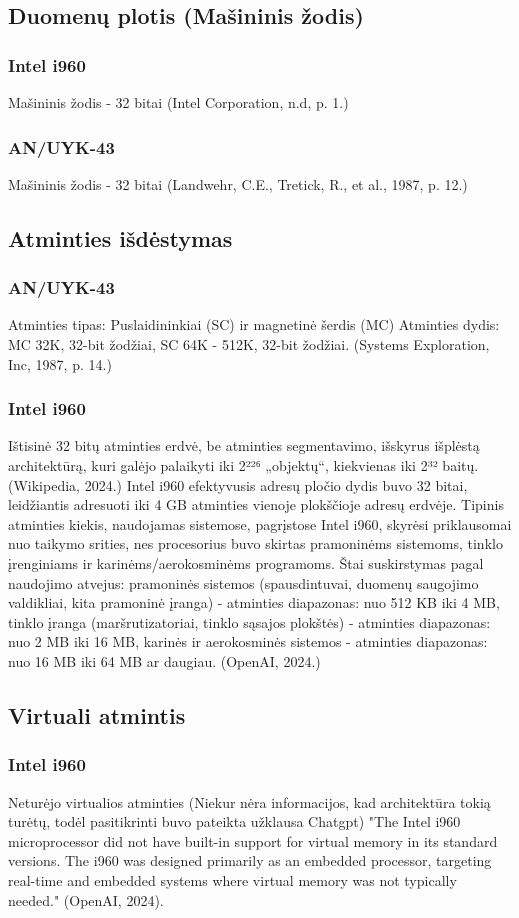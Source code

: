 \documentclass{article}
\begin{document}
\subsection{Duomenų plotis (Mašininis žodis)}
\subsubsection{Intel i960}
Mašininis žodis - 32 bitai (Intel Corporation, n.d, p. 1.)
\subsubsection{AN/UYK-43}
Mašininis žodis - 32 bitai (Landwehr, C.E., Tretick, R., et al., 1987, p. 12.)
\subsection{Atminties išdėstymas}
\subsubsection{AN/UYK-43}
Atminties tipas: Puslaidininkiai (SC) ir  magnetinė šerdis (MC) Atminties dydis: MC 32K, 32-bit žodžiai, SC 64K - 512K, 32-bit žodžiai. (Systems Exploration, Inc, 1987, p. 14.)
\subsubsection{Intel i960}
Ištisinė 32 bitų atminties erdvė, be atminties segmentavimo, išskyrus išplėstą architektūrą, kuri galėjo palaikyti iki 2²²⁶ „objektų“, kiekvienas iki 2³² baitų. (Wikipedia, 2024.) Intel i960 efektyvusis adresų pločio dydis buvo 32 bitai, leidžiantis adresuoti iki 4 GB atminties vienoje plokščioje adresų erdvėje. Tipinis atminties kiekis, naudojamas sistemose, pagrįstose Intel i960, skyrėsi priklausomai nuo taikymo srities, nes procesorius buvo skirtas pramoninėms sistemoms, tinklo įrenginiams ir karinėms/aerokosminėms programoms. Štai suskirstymas pagal naudojimo atvejus: pramoninės sistemos (spausdintuvai, duomenų saugojimo valdikliai, kita pramoninė įranga) - atminties diapazonas: nuo 512 KB iki 4 MB, tinklo įranga (maršrutizatoriai, tinklo sąsajos plokštės) - atminties diapazonas: nuo 2 MB iki 16 MB, karinės ir aerokosminės sistemos - atminties diapazonas: nuo 16 MB iki 64 MB ar daugiau. (OpenAI, 2024.)
\subsection{Virtuali atmintis}
\subsubsection{Intel i960}
Neturėjo virtualios atminties (Niekur nėra informacijos, kad architektūra tokią turėtų, todėl pasitikrinti buvo pateikta užklausa Chatgpt) "The Intel i960 microprocessor did not have built-in support for virtual memory in its standard versions. The i960 was designed primarily as an embedded processor, targeting real-time and embedded systems where virtual memory was not typically needed." (OpenAI, 2024).
\end{document}
